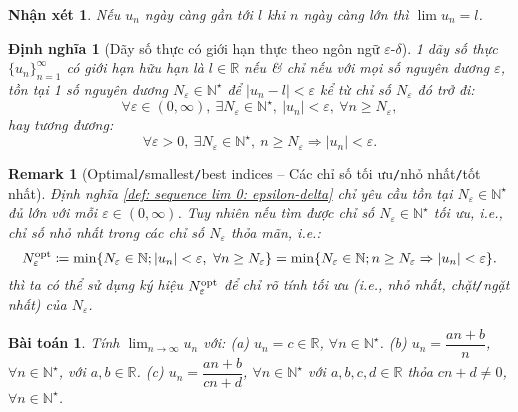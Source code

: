 \documentclass{article}
\newtheorem{baitoan}{Bài toán}
\newtheorem{dinhnghia}{Định nghĩa}
\newtheorem{nhanxet}{Nhận xét}
\newtheorem{remark}{Remark}
\begin{document}
\begin{nhanxet}
	Nếu $u_n$ ngày càng gần tới $l$ khi $n$ ngày càng lớn thì $\lim u_n = l$.
\end{nhanxet}

\begin{dinhnghia}[Dãy số thực có giới hạn thực theo ngôn ngữ $\varepsilon$-$\delta$]
	\label{def: sequence lim: epsilon-delta}
	1 dãy số thực $\{u_n\}_{n=1}^\infty$ có giới hạn hữu hạn là $l\in\mathbb{R}$ nếu \& chỉ nếu với mọi số nguyên dương $\varepsilon$, tồn tại 1 số nguyên dương $N_\varepsilon\in\mathbb{N}^\star$ để $|u_n - l| < \varepsilon$ kể từ chỉ số $N_\varepsilon$ đó trở đi:	
	\begin{equation*}
		\forall\varepsilon\in(0,\infty),\ \exists N_\varepsilon\in\mathbb{N}^\star,\ |u_n| < \varepsilon,\ \forall n\ge N_\varepsilon,
	\end{equation*}
	hay tương đương:
	\begin{equation*}
		\forall\varepsilon > 0,\ \exists N_\varepsilon\in\mathbb{N}^\star,\ n\ge N_\varepsilon\Rightarrow|u_n| < \varepsilon.
	\end{equation*}
\end{dinhnghia}

\begin{remark}[Optimal{\tt/}smallest{\tt/}best indices -- Các chỉ số tối ưu{\tt/}nhỏ nhất{\tt/}tốt nhất]
	Định nghĩa \ref{def: sequence lim 0: epsilon-delta} chỉ yêu cầu tồn tại $N_\varepsilon\in\mathbb{N}^\star$ đủ lớn với mỗi $\varepsilon\in(0,\infty)$. Tuy nhiên nếu tìm được chỉ số $N_\varepsilon\in\mathbb{N}^\star$ tối ưu, i.e., chỉ số nhỏ nhất trong các chỉ số $N_\varepsilon$ thỏa mãn, i.e.:
	\begin{equation*}
		N_\varepsilon^{\rm opt}\coloneqq\min\{N_\varepsilon\in\mathbb{N};|u_n| < \varepsilon,\ \forall n\ge N_\varepsilon\} = \min\{N_\varepsilon\in\mathbb{N};n\ge N_\varepsilon\Rightarrow|u_n| < \varepsilon\}.
	\end{equation*}
	thì ta có thể sử dụng ký hiệu $N_\varepsilon^{\rm opt}$ để chỉ rõ tính tối ưu (i.e., nhỏ nhất, chặt{\tt/}ngặt nhất) của $N_\varepsilon$.
\end{remark}

\begin{baitoan}
	Tính $\lim_{n\to\infty} u_n$ với: (a) $u_n = c\in\mathbb{R}$, $\forall n\in\mathbb{N}^\star$. (b) $u_n = \dfrac{an + b}{n}$, $\forall n\in\mathbb{N}^\star$, với $a,b\in\mathbb{R}$. (c) $u_n = \dfrac{an + b}{cn + d}$, $\forall n\in\mathbb{N}^\star$ với $a,b,c,d\in\mathbb{R}$ thỏa $cn + d\ne0$, $\forall n\in\mathbb{N}^\star$.
\end{baitoan}
\end{document}
